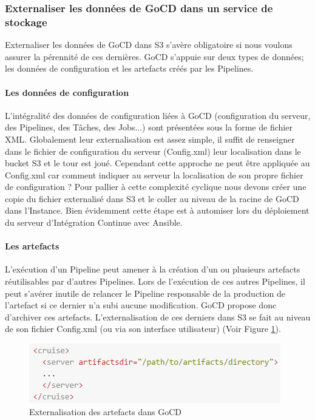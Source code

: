         \subsubsection{Externaliser les données de GoCD dans un service de stockage}
        Externaliser les données de GoCD dans S3 s'avère obligatoire si nous voulons assurer la pérennité de ces dernières. GoCD s'appuie sur deux types de données; les données de configuration et les artefacts créés par les Pipelines.

          \paragraph{Les données de configuration} L'intégralité des données de configuration liées à GoCD (configuration du serveur, des Pipelines, des Tâches, des Jobs...) sont présentées sous la forme de fichier XML. Globalement leur externalisation est assez simple, il suffit de renseigner dans le fichier de configuration du serveur (Config.xml) leur localisation dans le bucket S3 et le tour est joué. Cependant cette approche ne peut être appliquée au Config.xml car comment indiquer au serveur la localisation de son propre fichier de configuration ? Pour pallier à cette complexité cyclique nous devons créer une copie du fichier externalisé dans S3 et le coller au niveau de la racine de GoCD dans l'Instance. Bien évidemment cette étape est à automiser lors du déploiement du serveur d'Intégration Continue avec Ansible.

          \paragraph{Les artefacts} L'exécution d'un Pipeline peut amener à la création d'un ou plusieurs artefacts réutilisables par d'autres Pipelines. Lors de l'exécution de ces autres Pipelines, il peut s'avérer inutile de relancer le Pipeline responsable de la production de l'artefact si ce dernier n'a subi aucune modification. GoCD propose donc d'archiver ces artefacts. L'externalisation de ces derniers dans S3 se fait au niveau de son fichier Config.xml (ou via son interface utilisateur) (Voir Figure \ref{ArtifactsDir}).\\

          \begin{figure}
            \begin{center}
              \includegraphics[scale=0.7]{images/ArtifactsDir.png}
            \end{center}
            \caption{Externalisation des artefacts dans GoCD}
            \label{ArtifactsDir}
          \end{figure}

